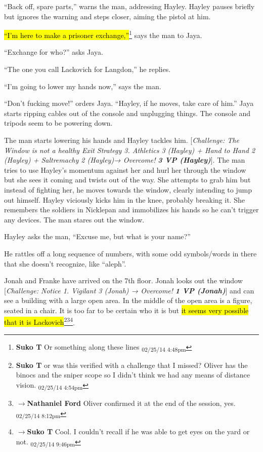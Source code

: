``Back off, spare parts,'' warns the man, addressing Hayley.  Hayley pauses briefly but ignores the warning and steps closer, aiming the pistol at him.



\hl{``I'm here to make a prisoner exchange,''}\footnote{\textbf{Suko T }Or something along these lines \textsubscript{02/25/14 4:48pm}} says the man to Jaya.

``Exchange for who?'' asks Jaya.

``The one you call Lackovich for Langdon,'' he replies.



``I'm going to lower my hands now,'' says the man.

``Don't fucking move!'' orders Jaya.  ``Hayley, if he moves, take care of him.''  Jaya starts ripping cables out of the console and unplugging things.  The console and tripods seem to be powering down.



The man starts lowering his hands and Hayley tackles him.  {[}\textit{Challenge: The Window is not a healthy Exit Strategy 3. Athletics 3 (Hayley) + Hand to Hand 2 (Hayley) + Saltremachy 2 (Hayley)→ Overcome! }\textit{\textbf{3 VP (Hayley)}}{]}.  The man tries to use Hayley's momentum against her and hurl her through the window but she sees it coming and twists out of the way.  She attempts to grab him but instead of fighting her, he moves towards the window, clearly intending to jump out himself.  Hayley viciously kicks him in the knee, probably breaking it.  She remembers the soldiers in Nicklepan and immobilizes his hands so he can't trigger any devices.  The man stares out the window.



Hayley asks the man, ``Excuse me, but what is your name?''

He rattles off a long sequence of numbers, with some odd symbols/words in there that she doesn't recognize, like ``aleph''.  



Jonah and Franke have arrived on the 7th floor.  Jonah looks out the window {[}\textit{Challenge: Notice 1. Vigilant 3 (Jonah)  → Overcome! }\textit{\textbf{1 VP (Jonah)}}{]} and can see a building with a large open area.  In the middle of the open area is a figure, seated in a chair.  It is too far to be certain who it is but \hl{it seems very possible that it is Lackovich}\footnote{\textbf{Suko T }or was this verified with a challenge that I missed?  Oliver has the binocs and the sniper scope so I didn't think we had any means of distance vision. \textsubscript{02/25/14 4:54pm}}\footnote{$\rightarrow$\textbf{Nathaniel Ford }Oliver confirmed it at the end of the session, yes. \textsubscript{02/25/14 8:12pm}}\footnote{$\rightarrow$\textbf{Suko T }Cool.  I couldn't recall if he was able to get eyes on the yard or not. \textsubscript{02/25/14 9:46pm}}.



